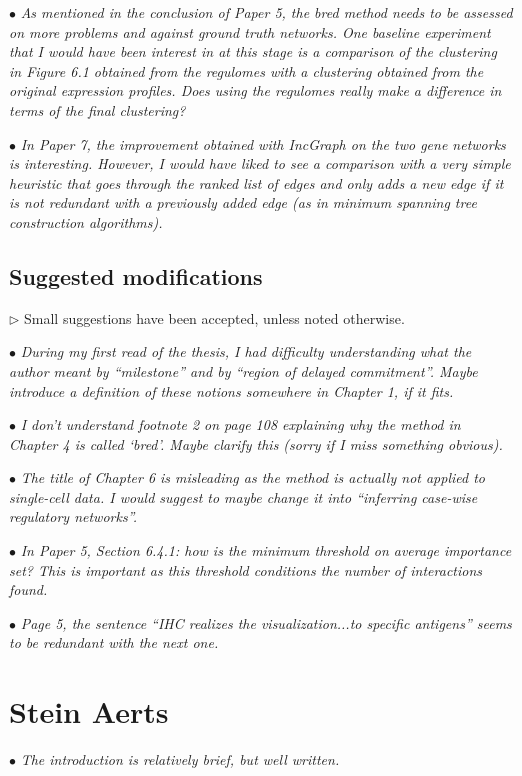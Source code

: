 \documentclass[10pt]{article}
\newcommand{\exam}[2][\  ]{\hspace{0pt}\marginpar{\color{red}#1}$\bullet$ \textit{#2}}
\newcommand{\imp}[1]{{\color{red} #1}}
\newcommand{\answ}[1]{{\color{blue} $\triangleright$ #1}}
\newcommand{\bigexclaim}{\raisebox{-0.1em}{\BigTriangleUp}\hspace{-0.32em}\llap{\small\textbf{!}}\hspace{0.32em}}
\newcommand{\tagimp}{\bigexclaim}
\newcommand{\tagtime}{{\Large $\hourglass$}}
\begin{document}
{\exam[\tagimp \tagtime]{As mentioned in the conclusion of Paper 5, the bred method needs to be assessed on more
	problems and against ground truth networks. One baseline experiment that I would have
	been interest in at this stage is \imp{a comparison of the clustering in Figure 6.1 obtained from
	the regulomes with a clustering obtained from the original expression profiles.} Does using
	the regulomes really make a difference in terms of the final clustering?}

\exam[\tagtime]{In Paper 7, the improvement obtained with IncGraph on the two gene networks is interesting.
	However, \imp{I would have liked to see a comparison with a very simple heuristic that goes
	through the ranked list of edges and only adds a new edge if it is not redundant with a
	previously added edge} (as in minimum spanning tree construction algorithms).}


\subsection{Suggested modifications}
\answ{Small suggestions have been accepted, unless noted otherwise.}

\exam{During my first read of the thesis, I had difficulty understanding what the author meant by
	“milestone” and by “region of delayed commitment”. Maybe introduce a definition of these
	notions somewhere in Chapter 1, if it fits.}

\exam{I don’t understand footnote 2 on page 108 explaining why the method in Chapter 4 is called
	‘bred’. Maybe clarify this (sorry if I miss something obvious).}

\exam{The title of Chapter 6 is misleading as the method is actually not applied to single-cell data.
	I would suggest to maybe change it into “inferring case-wise regulatory networks”.}

\exam{In Paper 5, Section 6.4.1: how is the minimum threshold on average importance set? This is
	important as this threshold conditions the number of interactions found.}

\exam{Page 5, the sentence “IHC realizes the visualization...to specific antigens” seems to be
	redundant with the next one.}
 


\section{Stein Aerts}


\exam{The introduction is relatively brief, but well
written.}

}
\end{document}
